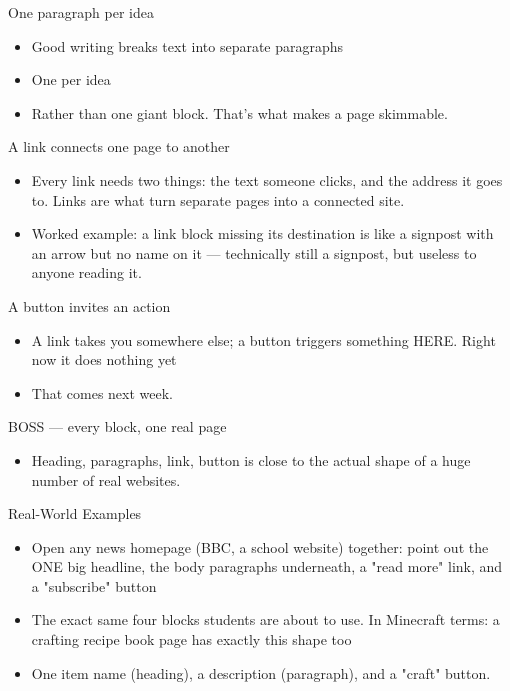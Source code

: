 \documentclass[aspectratio=169]{beamer}
\begin{document}
\begin{frame}{One paragraph per idea}
    \large
    \begin{itemize}
        \item Good writing breaks text into separate paragraphs
        \item One per idea
        \item Rather than one giant block. That's what makes a page skimmable.
    \end{itemize}
\end{frame}


\begin{frame}{A link connects one page to another}
    \large
    \begin{itemize}
        \item Every link needs two things: the text someone clicks, and the address it goes to. Links are what turn separate pages into a connected site.
        \item Worked example: a link block missing its destination is like a signpost with an arrow but no name on it — technically still a signpost, but useless to anyone reading it.
    \end{itemize}
\end{frame}


\begin{frame}{A button invites an action}
    \large
    \begin{itemize}
        \item A link takes you somewhere else; a button triggers something HERE. Right now it does nothing yet
        \item That comes next week.
    \end{itemize}
\end{frame}


\begin{frame}{BOSS — every block, one real page}
    \large
    \begin{itemize}
        \item Heading, paragraphs, link, button is close to the actual shape of a huge number of real websites.
    \end{itemize}
\end{frame}

\begin{frame}{Real-World Examples}
    \large
    \begin{itemize}
        \item Open any news homepage (BBC, a school website) together: point out the ONE big headline, the body paragraphs underneath, a "read more" link, and a "subscribe" button
        \item The exact same four blocks students are about to use. In Minecraft terms: a crafting recipe book page has exactly this shape too
        \item One item name (heading), a description (paragraph), and a "craft" button.
    \end{itemize}
\end{frame}
\end{document}
